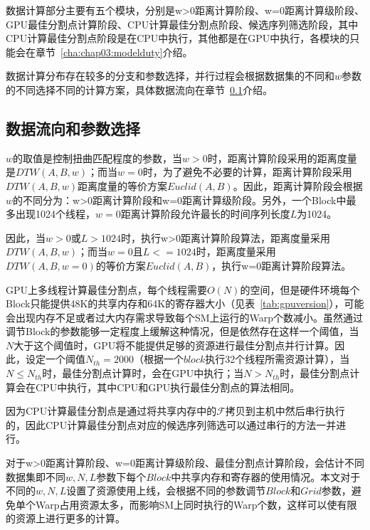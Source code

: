 数据计算部分主要有五个模块，分别是w>0距离计算阶段、w=0距离计算级阶段、GPU最佳分割点计算阶段、CPU计算最佳分割点阶段、候选序列筛选阶段，其中CPU计算最佳分割点阶段是在CPU中执行，其他都是在GPU中执行，各模块的只能会在章节~\ref{cha:chap03:modelduty}介绍。

数据计算分布存在较多的分支和参数选择，并行过程会根据数据集的不同和$w$参数的不同选择不同的计算方案，具体数据流向在章节~\ref{cha:chap03:parachoose}介绍。

\subsection{数据流向和参数选择}
\label{cha:chap03:parachoose}

$w$的取值是控制扭曲匹配程度的参数，当$w>0$时，距离计算阶段采用的距离度量是$DTW(A,B,w)$；而当$w=0$时，为了避免不必要的计算，距离计算阶段采用$DTW(A,B,w)$距离度量的等价方案$Euclid(A,B)$。因此，距离计算阶段会根据$w$的不同分为：w>0距离计算阶段和w=0距离计算级阶段。另外，一个Block中最多出现1024个线程，$w=0$距离计算阶段允许最长的时间序列长度$L$为1024。

因此，当$w>0$或$L>1024$时，执行w>0距离计算阶段算法，距离度量采用$DTW(A,B,w)$；而当$w=0$且$L<=1024$时，距离度量采用$DTW(A,B,w=0)$的等价方案$Euclid(A,B)$，执行w=0距离计算阶段算法。

GPU上多线程计算最佳分割点，每个线程需要$O(N)$的空间，但是硬件环境每个Block只能提供48K的共享内存和64K的寄存器大小（见表~\ref{tab:gpuversion}），可能会出现内存不足或者过大内存需求导致每个SM上运行的Warp个数减小。虽然通过调节Block的参数能够一定程度上缓解这种情况，但是依然存在这样一个阈值，当$N$大于这个阈值时，GPU将不能提供足够的资源进行最佳分割点并行计算。因此，设定一个阈值$N_{th}=2000$（根据一个$block$执行32个线程所需资源计算），当$N\leq N_{th}$时，最佳分割点计算时，会在GPU中执行；当$N>N_{th}$时，最佳分割点计算会在CPU中执行，其中CPU和GPU执行最佳分割点的算法相同。

因为CPU计算最佳分割点是通过将共享内存中的$\mathcal{F}$拷贝到主机中然后串行执行的，因此CPU计算最佳分割点对应的候选序列筛选可以通过串行的方法一并进行。

对于w>0距离计算阶段、w=0距离计算级阶段、最佳分割点计算阶段，会估计不同数据集即不同$w,N,L$参数下每个$Block$中共享内存和寄存器的使用情况。本文对于不同的$w,N,L$设置了资源使用上线，会根据不同的参数调节$Block$和$Grid$参数，避免单个Warp占用资源太多，而影响SM上同时执行的Warp个数，这样可以使有限的资源上进行更多的计算。
%

